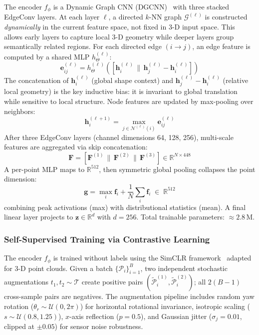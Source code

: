 \documentclass[conference]{IEEEtran}
\begin{document}
The encoder $f_\phi$ is a Dynamic Graph CNN (DGCNN)~\cite{@TODO} with three stacked EdgeConv layers. At each layer $\ell$, a directed $k$-NN graph $\mathcal{G}^{(\ell)}$ is constructed \emph{dynamically} in the current feature space, not fixed in 3-D input space. This allows early layers to capture local 3-D geometry while deeper layers group semantically related regions. For each directed edge $(i \to j)$, an edge feature is computed by a shared MLP $h_\Theta^{(\ell)}$:
\begin{equation}
	\mathbf{e}_{ij}^{(\ell)} = h_\Theta^{(\ell)}\!\left([\mathbf{h}_i^{(\ell)} \,\|\, \mathbf{h}_j^{(\ell)} - \mathbf{h}_i^{(\ell)}]\right)
	\label{eq:edgeconv}
\end{equation}
The concatenation of $\mathbf{h}_i^{(\ell)}$ (global shape context) and $\mathbf{h}_j^{(\ell)} - \mathbf{h}_i^{(\ell)}$ (relative local geometry) is the key inductive bias: it is invariant to global translation while sensitive to local structure. Node features are updated by max-pooling over neighbors:
\begin{equation}
	\mathbf{h}_i^{(\ell+1)} = \max_{j \in \mathcal{N}^{(\ell)}(i)} \mathbf{e}_{ij}^{(\ell)}
	\label{eq:maxpool}
\end{equation}
After three EdgeConv layers (channel dimensions 64, 128, 256), multi-scale features are aggregated via skip concatenation:
\begin{equation}
	\mathbf{F} = [\mathbf{F}^{(1)} \,\|\, \mathbf{F}^{(2)} \,\|\, \mathbf{F}^{(3)}] \in \mathbb{R}^{N \times 448}
	\label{eq:skip-concat}
\end{equation}
A per-point MLP maps to $\mathbb{R}^{512}$, then symmetric global pooling collapses the point dimension:
\begin{equation}
	\mathbf{g} = \max_i \mathbf{f}_i + \frac{1}{N}\sum_i \mathbf{f}_i \;\in\; \mathbb{R}^{512}
	\label{eq:global-pool}
\end{equation}
combining peak activations (max) with distributional statistics (mean). A final linear layer projects to $\mathbf{z} \in \mathbb{R}^d$ with $d = 256$. Total trainable parameters: $\approx 2.8\,\text{M}$.

\subsubsection{Self-Supervised Training via Contrastive Learning}

The encoder $f_\phi$ is trained without labels using the SimCLR framework~\cite{@TODO} adapted for 3-D point clouds. Given a batch $\{\mathcal{P}_i\}_{i=1}^B$, two independent stochastic augmentations $t_1, t_2 \sim \mathcal{T}$ create positive pairs $(\tilde{\mathcal{P}}_i^{(1)}, \tilde{\mathcal{P}}_i^{(2)})$; all $2(B-1)$ cross-sample pairs are negatives. The augmentation pipeline includes random yaw rotation ($\theta_r \sim \mathcal{U}(0, 2\pi)$) for horizontal rotational invariance, isotropic scaling ($s \sim \mathcal{U}(0.8, 1.25)$), $x$-axis reflection ($p = 0.5$), and Gaussian jitter ($\sigma_j = 0.01$, clipped at $\pm 0.05$) for sensor noise robustness.
\end{document}
